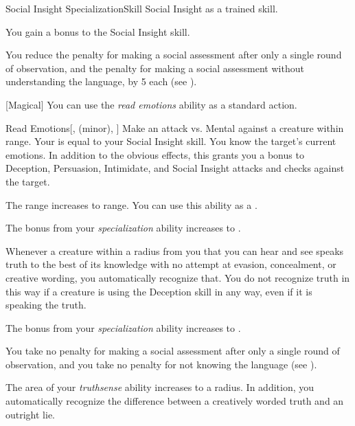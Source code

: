     \begin{feat}{Social Insight Specialization}{Skill}
        \featpre Social Insight as a trained skill.

         You gain a  bonus to the Social Insight skill.

         You reduce the penalty for making a social assessment after only a single round of observation, and the penalty for making a social assessment without understanding the language, by 5 each (see ).

        [Magical] You can use the \textit{read emotions} ability as a standard action.
        \begin{freeability}{Read Emotions}[,  (minor), ]
            Make an attack vs. Mental against a creature within \rngshort range.
            Your  is equal to your Social Insight skill.
            \hit You know the target's current emotions.
            In addition to the obvious effects, this grants you a  bonus to Deception, Persuasion, Intimidate, and Social Insight attacks and checks against the target.

            \rankline
             The range increases to \rnglong range.
             You can use this ability as a .
        \end{freeability}

         The bonus from your \textit{specialization} ability increases to .

         Whenever a creature within a \arealarge radius  from you that you can hear and see speaks truth to the best of its knowledge with no attempt at evasion, concealment, or creative wording, you automatically recognize that.
        You do not recognize truth in this way if a creature is using the Deception skill in any way, even if it is speaking the truth.

         The bonus from your \textit{specialization} ability increases to .

         You take no penalty for making a social assessment after only a single round of observation, and you take no penalty for not knowing the language (see ).

         The area of your \textit{truthsense} ability increases to a \gargarea radius.
        In addition, you automatically recognize the difference between a creatively worded truth and an outright lie.
    \end{feat}

